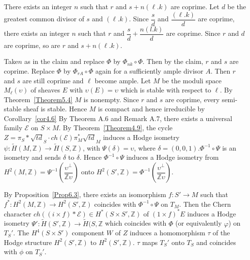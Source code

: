 \begin{claim}
There exists an integer $n$ such that $r$ and $s+n(\ell.k)$  are
coprime. 
Let $d$ be the greatest common divisor of $s$ and $(\ell. k)$. Since
$\dfrac{s}{d}$ and $\dfrac{(\ell.k)}{d}$ are coprime, there exists an
integer $n$ such that $r$ and $\dfrac{s}{d}+\dfrac{n(l.k)}{d}$ are
coprime. Since $r$ and $d$ are coprime, so are $r$ and $s+n(\ell.k)$. 

Take\pageoriginale $n$ as in the claim and replace $\Phi$ by $\Phi_{n
k}\circ \Phi$. Then by the claim, $r$ and $s$ are coprime. Replace
$\Phi$ by $\Phi_{r A}\circ \Phi$ again for a sufficiently ample
divisor $A$. Then $r$ and $s$ are still coprime and $\ell$ become
ample. Let $M$ be the moduli space $M_{\ell}(\upsilon)$ of sheaves $E$
with $\upsilon(E)=\upsilon$ which is stable with respect to $\ell$. By
Theorem~\ref{Theorem5.4} $M$ is nonempty. Since $r$ and $s$ are
coprime, every semi-stable sheaf is stable. Hence $M$ is compact and
hence irreducible by Corollary~\ref{cor4.6} By Theorem A.6 and Remark
A.7, there exists a universal family $\mathscr{E}$ on $S\times M$. By
Theorem~\ref{Theorem4.9}, the cycle $Z=\pi_S\ast\sqrt{td}_S\cdot
ch(\mathscr{E})\pi^{\ast}_M\sqrt{td}_M$ induces a Hodge isometry
$\psi:\widetilde{H}(M,\mathbb{Z})\to \widetilde{H}(S,\mathbb{Z})$, with
$\Psi(\delta)=\upsilon$, where $\delta=(0,0,1).\Phi^{-1}\circ \Psi$ is
an isometry and sends $\delta$ to $\delta$. Hence
$\Phi^{-1}\circ \Psi$ induces a Hodge isometry from
$H^{2}(M,\mathbb{Z})=\Psi^{-1}\left(\dfrac{\upsilon^{\perp}}{\mathbb{Z}
\upsilon}\right)$ onto
$H^{2}(S',\mathbb{Z})=\Phi^{-1}\left(\dfrac{\upsilon^{\perp}}{\mathbb{Z}\upsilon}\right)$. 

By Proposition~\ref{Prop6.3}, there exists an isomorphism $f:S'\to M$
such that $f^{\ast}:H^{2}(M,\mathbb{Z})\to H^{2}(S',\mathbb{Z})$
coincides with $\Phi^{-1}\circ \Psi$ on $T_M$. Then the Chern
character $ch((i\times f)\ast \mathscr{E})\in H^{\ast}(S\times
S', \mathbb{Z})$ of $(1\times f)^{\ast}E$ induces a Hodge isometry
$\Psi':\widetilde{H}(S',\mathbb{Z})\to \widetilde{H}(S,\mathbb{Z}$
which coincides with $\Phi$ (or equivalently $\varphi$) on $T_S'$. The
$H^{4}(S\times S')$ component $W$ of $Z$ induces a homomorphism $\tau$
of the Hodge structure $H^{2}(S',\mathbb{Z})$ to
$H^{2}(S',\mathbb{Z})$. $\tau$ maps $T_S'$ onto $T_S$ and coincides
with $\phi$ on $T_S'$. 
\enprf
\end{claim}

